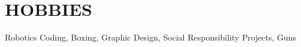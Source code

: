 \documentclass[letterpaper,11pt]{article}
\begin{document}
\section{HOBBIES}
 \begin{itemize}[leftmargin=0in, label={}]
    \small{\item{
     {Robotics Coding, Boxing, Graphic Design, Social Responsibility Projects, Guns}\vspace{2pt} \\
    }}
 \end{itemize}
 

 
\end{document}
